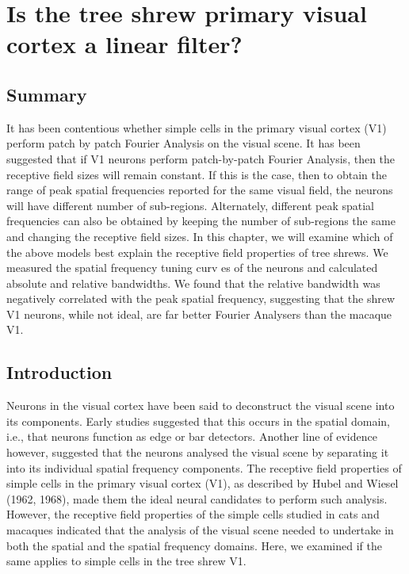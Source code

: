 \chapter[Is V1 a linear filter?]{Is the tree shrew primary visual cortex a linear filter?}

	\section{Summary}
	It has been contentious whether simple cells in the primary visual cortex (V1) perform patch by patch Fourier Analysis on the visual scene. It has been suggested that if V1 neurons perform patch-by-patch Fourier Analysis, then the receptive field sizes will remain constant. If this is the case, then to obtain the range of peak spatial frequencies reported for the same visual field, the neurons will have different number of sub-regions. Alternately, different peak spatial frequencies can also be obtained by keeping the number of sub-regions the same and changing the receptive field sizes. In this chapter, we will examine which of the above models best explain the receptive field properties of tree shrews. We measured the spatial frequency tuning curv es of the neurons and calculated absolute and relative bandwidths. We found that the relative bandwidth was negatively correlated with the peak spatial frequency, suggesting that the shrew V1 neurons, while not ideal, are far better Fourier Analysers than the macaque V1.

	\section{Introduction}
	
	Neurons in the visual cortex have been said to deconstruct the visual scene into its components. Early studies suggested that this occurs in the spatial domain, i.e., that neurons function as edge or bar detectors. Another line of evidence however, suggested that the neurons analysed the visual scene by separating it into its individual spatial frequency components. The receptive field properties of simple cells in the primary visual cortex (V1), as described by Hubel and Wiesel (1962, 1968), made them the ideal neural candidates to perform such analysis. However, the receptive field properties of the simple cells studied in cats and macaques indicated that the analysis of the visual scene needed to undertake in both the spatial and the spatial frequency domains. Here, we examined if the same applies to simple cells in the tree shrew V1.
	
